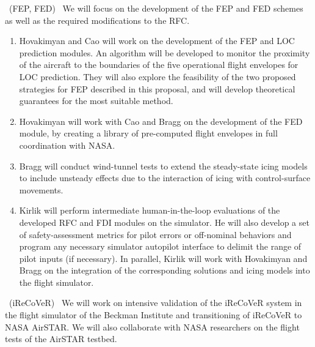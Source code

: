 \documentclass[letter,onecolumn,12pt]{aiaa-tc}
\let\origdescription\description
\renewenvironment{description}{
  \setlength{\leftmargini}{0mm}
  \origdescription
}
{\endlist}
\begin{document}
\begin{description}
\begin{enumerate}
        \end{enumerate}



    \item[Year II:] ~(FEP, FED)~ We will focus on the development of the FEP and FED schemes as well as the required modifications to the RFC.
        \begin{enumerate}
         \vspace{-2mm}
         \setlength{\itemsep}{-1pt}

            \item Hovakimyan and Cao will work on the development of the FEP and LOC prediction modules. An algorithm will be developed to monitor the proximity of the aircraft to the boundaries of the five operational flight envelopes for LOC prediction. They will also explore the feasibility of the two proposed strategies for FEP described in this proposal, and will develop theoretical guarantees for the most suitable method.

           \item Hovakimyan will work with Cao and Bragg on the development of the FED module, by creating a library of pre-computed flight envelopes in full coordination with NASA.

            \item Bragg will conduct wind-tunnel tests to extend the steady-state icing models to include unsteady effects due to the interaction of icing with control-surface movements.

            \item Kirlik will perform intermediate human-in-the-loop evaluations of the developed RFC and FDI modules on the simulator. He will also develop a set of safety-assessment metrics for pilot errors or off-nominal behaviors and program any necessary simulator autopilot interface to delimit the range of pilot inputs (if necessary). In parallel, Kirlik will work with Hovakimyan and Bragg on the integration of the corresponding solutions and icing models into the flight simulator.

        \end{enumerate}

      \item[Year III:] ~(iReCoVeR)~ We will work on intensive validation of the iReCoVeR system in the flight simulator of the Beckman Institute and transitioning of iReCoVeR to NASA AirSTAR. We will also collaborate with NASA researchers on the flight tests of the AirSTAR testbed.
        \begin{enumerate}
         \vspace{-2mm}
         \setlength{\itemsep}{-1pt}


\end{enumerate}
\end{description}
\end{document}
